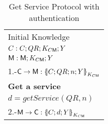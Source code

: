 \begin{table}[htb]
\footnotesize
\begin{center}
\caption{Get Service Protocol with authentication}
\label{table:ProtGetServicesAuth}
\begin{tabular}{|l|}
\hline
           Initial Knowledge                                                             \\
            $C:C; QR ;  K_{C\textsf{M}} ; Y$                                    \\
            $\textsf{M}: \textsf{M}; K_{C\textsf{M}} ; Y$    \\ \hline \hline 
           1.-$\Client\rightarrow \Server: \fat{C \lnk QR \lnk n \lnk Y}_{K_{C\Server}}$          \\ 
           \textbf{Get a service}                                                                        \\
           \hspace{5mm} $d=getService(QR,n)$                                  \\  
           2.-$\Server\rightarrow \Client: \fat{C \lnk d \lnk Y}_{K_{C\Server}}$       \\  \hline \hline
\end{tabular}
\end{center}
\end{table}
\normalsize


